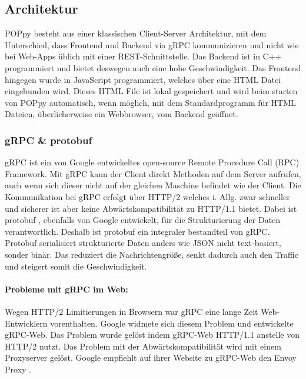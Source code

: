 \documentclass[12pt]{article}
\begin{document}
\subsection{Architektur}
POPpy besteht aus einer klassischen Client-Server Architektur, mit dem 
Unterschied, dass Frontend und Backend via gRPC \cite{grpc} kommunizieren und 
nicht wie bei Web-Apps üblich mit einer REST-Schnittstelle. Das Backend ist in 
C++ programmiert und bietet deswegen auch eine hohe Geschwindigkeit. 
\newline
\newline
Das Frontend hingegen wurde in JavaScript programmiert, welches über eine HTML
Datei eingebunden wird. Dieses HTML File ist lokal gespeichert und wird beim 
starten von POPpy automatisch, wenn möglich, mit dem Standardprogramm für 
HTML Dateien, überlicherweise ein Webbrowser, vom Backend geöffnet.

\subsubsection{gRPC \& protobuf}
gRPC ist ein von Google entwickeltes open-source Remote Procedure Call (RPC) 
Framework. Mit gRPC kann der Client direkt Methoden auf dem Server aufrufen, 
auch wenn sich dieser nicht auf der gleichen Maschine befindet wie der Client.
Die Kommunikation bei gRPC erfolgt über HTTP/2 welches i. Allg. zwar schneller 
und sicherer ist aber keine Abwärtskompatibilität zu HTTP/1.1 bietet.
\newline
\newline
Dabei ist protobuf \cite{protobuf}, ebenfalls von Google entwickelt, für die 
Strukturierung der Daten verantwortlich. Deshalb ist protobuf ein integraler 
bestandteil von gRPC. Protobuf serialisiert strukturierte Daten anders wie JSON 
nicht text-basiert, sonder binär. Das reduziert die Nachrichtengröße, senkt 
dadurch auch den Traffic und steigert somit die Geschwindigkeit.

\paragraph{Probleme mit gRPC im Web:}
Wegen HTTP/2 Limitierungen in Browsern war gRPC eine lange Zeit Web-Entwicklern 
vorenthalten. Google widmete sich diesem Problem und entwickelte gRPC-Web.
\cite{grpc-web}
\newline
Das Problem wurde gelöst indem gRPC-Web HTTP/1.1 anstelle von HTTP/2 nutzt. Das
Problem mit der Abwärtskompatibilität wird mit einem Proxyserver gelöst. Google
empfiehlt auf ihrer Website zu gRPC-Web den Envoy Proxy \cite{envoy}.
\end{document}
